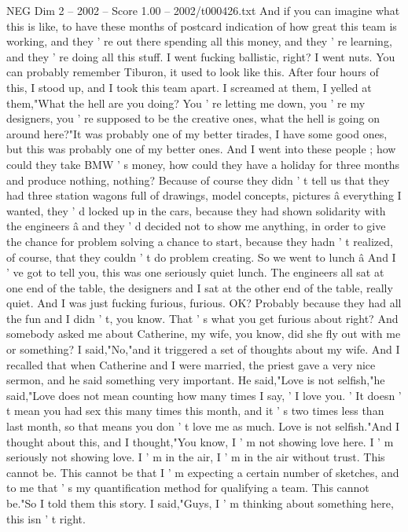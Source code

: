 \begin{textsample}{NEG Dim 2 – 2002 – Score 1.00 – 2002/t000426.txt}
And if you can imagine what this is like, to have these months of postcard indication of how great this team is working, and they ' re out there spending all this money, and they ' re learning, and they ' re doing all this stuff.
I went fucking ballistic, right?
I went nuts.
You can probably remember Tiburon, it used to look like this.
After four hours of this, I stood up, and I took this team apart.
I screamed at them, I yelled at them,"What the hell are you doing?
You ' re letting me down, you ' re my designers, you ' re supposed to be the creative ones, what the hell is going on around here?"It was probably one of my better tirades, I have some good ones, but this was probably one of my better ones.
And I went into these people ; how could they take BMW ' s money, how could they have a holiday for three months and produce nothing, nothing?
Because of course they didn ' t tell us that they had three station wagons full of drawings, model concepts, pictures â everything I wanted, they ' d locked up in the cars, because they had shown solidarity with the engineers â and they ' d decided not to show me anything, in order to give the chance for problem solving a chance to start, because they hadn ' t realized, of course, that they couldn ' t do problem creating.
So we went to lunch â And I ' ve got to tell you, this was one seriously quiet lunch.
The engineers all sat at one end of the table, the designers and I sat at the other end of the table, really quiet.
And I was just fucking furious, furious.
OK?
Probably because they had all the fun and I didn ' t, you know.
That ' s what you get furious about right?
And somebody asked me about Catherine, my wife, you know, did she fly out with me or something?
I said,"No,"and it triggered a set of thoughts about my wife.
And I recalled that when Catherine and I were married, the priest gave a very nice sermon, and he said something very important.
He said,"Love is not selfish,"he said,"Love does not mean counting how many times I say, ' I love you. ' It doesn ' t mean you had sex this many times this month, and it ' s two times less than last month, so that means you don ' t love me as much.
Love is not selfish."And I thought about this, and I thought,"You know, I ' m not showing love here.
I ' m seriously not showing love.
I ' m in the air, I ' m in the air without trust.
This cannot be.
This cannot be that I ' m expecting a certain number of sketches, and to me that ' s my quantification method for qualifying a team.
This cannot be."So I told them this story.
I said,"Guys, I ' m thinking about something here, this isn ' t right.

\end{textsample}
